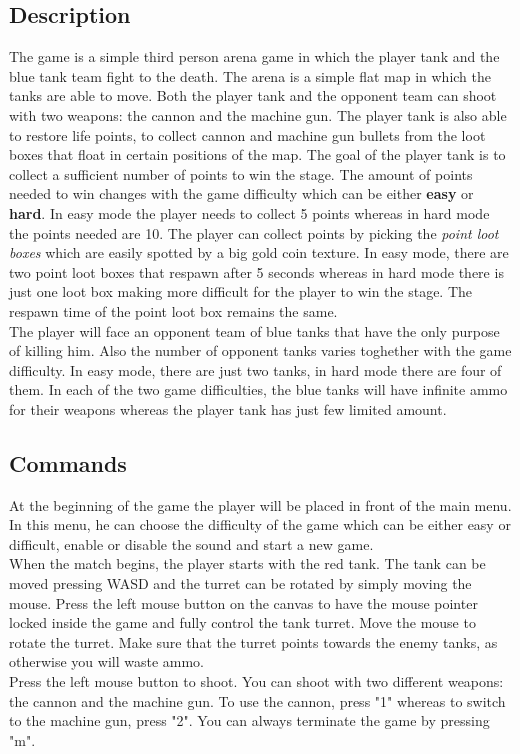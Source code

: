 \documentclass[14pt]{article}
\begin{document}
\subsection{Description}
The game is a simple third person arena game in which the player tank and the blue tank team fight to the death. The arena is a simple flat map in which the tanks are able to move. Both the player tank and the opponent team can shoot with two weapons: the cannon and the machine gun. The player tank is also able to restore life points, to collect cannon and machine gun bullets from the loot boxes that float in certain positions of the map. The goal of the player tank is to collect a sufficient number of points to win the stage. The amount of points needed to win changes with the game difficulty which can be either \textbf{easy} or \textbf{hard}. In easy mode the player needs to collect 5 points whereas in hard mode the points needed are 10. The player can collect points by picking the \textit{point loot boxes} which are easily spotted by a big gold coin texture. In easy mode, there are two point loot boxes that respawn after 5 seconds whereas in hard mode there is just one loot box making more difficult for the player to win the stage. The respawn time of the point loot box remains the same. \\
The player will face an opponent team of blue tanks that have the only purpose of killing him. Also the number of opponent tanks varies toghether with the game difficulty. In easy mode, there are just two tanks, in hard mode there are four of them. In each of the two game difficulties, the blue tanks will have infinite ammo for their weapons whereas the player tank has just few limited amount.
\subsection{Commands}
At the beginning of the game the player will be placed in front of the main menu. In this menu, he can choose the difficulty of the game which can be either easy or difficult, enable or disable the sound and start a new game. \\
When the match begins, the player starts with the red tank. The tank can be moved pressing WASD and the turret can be rotated by simply moving the mouse. Press the left mouse button on the canvas to have the mouse pointer locked inside the game and fully control the tank turret. Move the mouse to rotate the turret. Make sure that the turret points towards the enemy tanks, as otherwise you will waste ammo.\\
Press the left mouse button to shoot. You can shoot with two different weapons: the cannon and the machine gun. To use the cannon, press "1" whereas to switch to the machine gun, press "2". You can always terminate the game by pressing "m".
\end{document}
